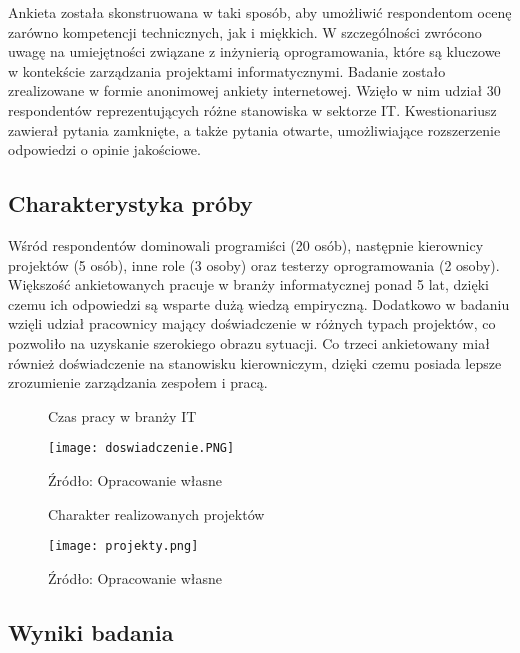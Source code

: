 Ankieta została skonstruowana w taki sposób, aby umożliwić respondentom ocenę zarówno kompetencji technicznych, jak i miękkich. W szczególności zwrócono uwagę na umiejętności związane z inżynierią oprogramowania, które są kluczowe w kontekście zarządzania projektami informatycznymi. Badanie zostało zrealizowane w formie anonimowej ankiety internetowej. Wzięło w nim udział 30 respondentów reprezentujących różne stanowiska w sektorze IT. Kwestionariusz zawierał pytania zamknięte, a także pytania otwarte, umożliwiające rozszerzenie odpowiedzi o opinie jakościowe.

\subsection{Charakterystyka próby}
Wśród respondentów dominowali programiści (20 osób), następnie kierownicy projektów (5 osób), inne role (3 osoby) oraz testerzy oprogramowania (2 osoby). Większość ankietowanych pracuje w branży informatycznej ponad 5 lat, dzięki czemu ich odpowiedzi są wsparte dużą wiedzą empiryczną. Dodatkowo w badaniu wzięli udział pracownicy mający doświadczenie w różnych typach projektów, co pozwoliło na uzyskanie szerokiego obrazu sytuacji. Co trzeci ankietowany miał również doświadczenie na stanowisku kierowniczym, dzięki czemu posiada lepsze zrozumienie zarządzania zespołem i pracą.

\begin{figure}
  \caption{Czas pracy w branży IT}
  \centering
  \texttt{[image: doswiadczenie.PNG]}
  \caption*{Źródło: Opracowanie własne}
\end{figure}

\begin{figure}
  \caption{Charakter realizowanych projektów}
  \centering
  \texttt{[image: projekty.png]}
  \caption*{Źródło: Opracowanie własne}
\end{figure}

\subsection{Wyniki badania}


